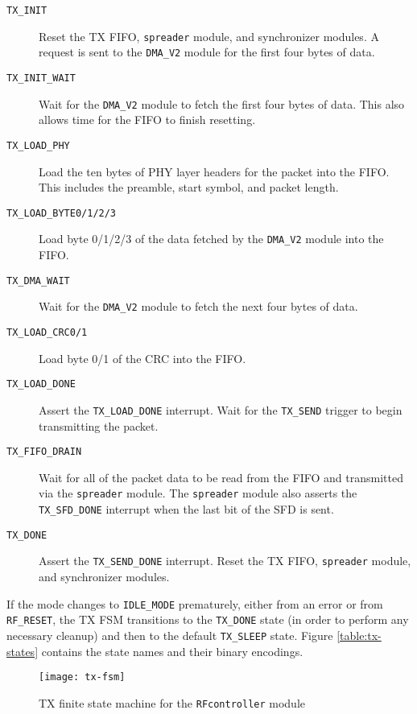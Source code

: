 \begin{description}
	\item[\texttt{TX\_INIT}] Reset the TX FIFO, \texttt{spreader} module, and synchronizer modules. A request is sent to the \texttt{DMA\_V2} module for the first four bytes of data.
	\item[\texttt{TX\_INIT\_WAIT}] Wait for the \texttt{DMA\_V2} module to fetch the first four bytes of data. This also allows time for the FIFO to finish resetting.
	\item[\texttt{TX\_LOAD\_PHY}] Load the ten bytes of PHY layer headers for the packet into the FIFO. This includes the preamble, start symbol, and packet length.
	\item[\texttt{TX\_LOAD\_BYTE0/1/2/3}] Load byte 0/1/2/3 of the data fetched by the \texttt{DMA\_V2} module into the FIFO.
	\item[\texttt{TX\_DMA\_WAIT}] Wait for the \texttt{DMA\_V2} module to fetch the next four bytes of data.
	\item[\texttt{TX\_LOAD\_CRC0/1}] Load byte 0/1 of the CRC into the FIFO.
	\item[\texttt{TX\_LOAD\_DONE}] Assert the \texttt{TX\_LOAD\_DONE} interrupt. Wait for the \texttt{TX\_SEND} trigger to begin transmitting the packet.
	\item[\texttt{TX\_FIFO\_DRAIN}] Wait for all of the packet data to be read from the FIFO and transmitted via the \texttt{spreader} module. The \texttt{spreader} module also asserts the \texttt{TX\_SFD\_DONE} interrupt when the last bit of the SFD is sent.
	\item[\texttt{TX\_DONE}] Assert the \texttt{TX\_SEND\_DONE} interrupt. Reset the TX FIFO, \texttt{spreader} module, and synchronizer modules.
\end{description}

If the mode changes to \texttt{IDLE\_MODE} prematurely, either from an error or from \texttt{RF\_RESET}, the TX FSM transitions to the \texttt{TX\_DONE} state (in order to perform any necessary cleanup) and then to the default \texttt{TX\_SLEEP} state. Figure \ref{table:tx-states} contains the state names and their binary encodings. 

\begin{figure}
	\centering
	\texttt{[image: tx-fsm]}
	\caption{TX finite state machine for the \texttt{RFcontroller} module}
	\label{fig:tx-fsm}
\end{figure}

